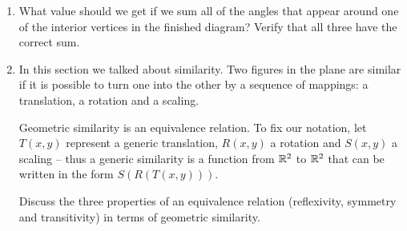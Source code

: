 \begin{enumerate}
\item What value should we get if we sum all of the
angles that appear around one of the interior vertices in the 
finished diagram?  Verify that all three have the correct sum.

\begin{center}

\end{center}

\wbvfill

\workbookpagebreak

\item In this section we talked about similarity.  Two figures in 
the plane are 
similar if it is possible to turn one into the other
by a sequence of mappings: a translation, a rotation and a scaling.  

Geometric similarity is an equivalence relation.  To fix our
notation, let $T(x,y)$ represent a generic translation, $R(x,y)$ a rotation
and $S(x,y)$ a scaling -- thus a generic similarity is a function from
${\mathbb R}^2$ to ${\mathbb R}^2$ that can be written in the form $S(R(T(x,y)))$.

Discuss the three properties of an equivalence relation (reflexivity, symmetry and transitivity) in terms of geometric similarity.

\wbvfill

\end{enumerate}



